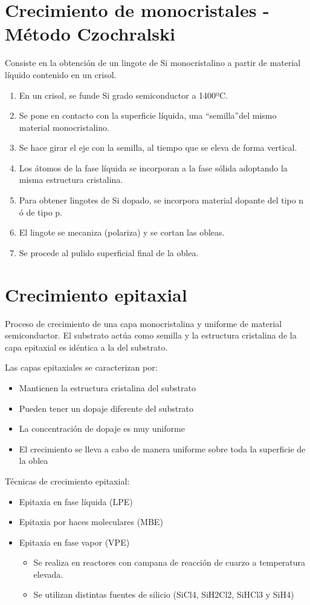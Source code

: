 \section{Crecimiento de monocristales - Método Czochralski}

Consiste en la obtención de un lingote de Si monocristalino a partir de material líquido contenido en un crisol.

\begin{enumerate}
    \item En un crisol, se funde Si grado semiconductor a 1400ºC.
    \item Se pone en contacto con la superficie líquida, una ``semilla''del mismo material monocristalino.
    \item Se hace girar el eje con la semilla, al tiempo que se eleva de forma vertical.
    \item Los átomos de la fase líquida se incorporan a la fase sólida adoptando la misma estructura cristalina.
    \item Para obtener lingotes de Si dopado, se incorpora material dopante del tipo n ó de tipo p.
    \item El lingote se mecaniza (polariza) y se cortan las obleas.
    \item Se procede al pulido superficial final de la oblea.
\end{enumerate}

\section{Crecimiento epitaxial}

Proceso de crecimiento de una capa monocristalina y uniforme de material semiconductor. El substrato actúa como semilla y la estructura cristalina de la capa epitaxial es idéntica a la del substrato.

Las capas epitaxiales se caracterizan por:
\begin{itemize}
    \item Mantienen la estructura cristalina del substrato
    \item Pueden tener un dopaje diferente del substrato
    \item La concentración de dopaje es muy uniforme
    \item El crecimiento se lleva a cabo de manera uniforme sobre toda la superficie de la oblea
\end{itemize}

Técnicas de crecimiento epitaxial:
\begin{itemize}
    \item Epitaxia en fase líquida (LPE)
    \item Epitaxia por haces moleculares (MBE)
    \item Epitaxia en fase vapor (VPE)
    \begin{itemize}
        \item Se realiza en reactores con campana de reacción de cuarzo a temperatura elevada.
        \item Se utilizan distintas fuentes de silicio (SiCl4, SiH2Cl2, SiHCl3 y SiH4)
    \end{itemize}
\end{itemize}

